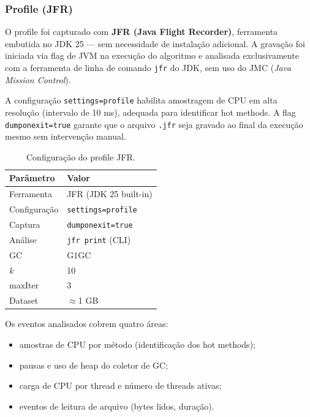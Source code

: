 \subsubsection{Profile (JFR)}

O profile foi capturado com \textbf{JFR (Java Flight Recorder)}, ferramenta embutida
no JDK 25 --- sem necessidade de instalação adicional. A gravação foi iniciada via
flag de JVM na execução do algoritmo e analisada exclusivamente com a ferramenta
de linha de comando \texttt{jfr} do JDK, sem uso do JMC (\textit{Java Mission Control}).

A configuração \texttt{settings=profile} habilita amostragem de CPU em alta resolução
(intervalo de 10 ms), adequada para identificar hot methods. A flag
\texttt{dumponexit=true} garante que o arquivo \texttt{.jfr} seja gravado ao final
da execução mesmo sem intervenção manual.

\begin{table}[H]
\centering
\begin{tabular}{ll}
\hline
\textbf{Parâmetro} & \textbf{Valor} \\
\hline
Ferramenta         & JFR (JDK 25 built-in) \\
Configuração       & \texttt{settings=profile} \\
Captura            & \texttt{dumponexit=true} \\
Análise            & \texttt{jfr print} (CLI) \\
GC                 & G1GC \\
\textit{k}         & 10 \\
maxIter            & 3 \\
Dataset            & $\approx$1 GB \\
\hline
\end{tabular}
\caption{Configuração do profile JFR.}
\label{tab:jfr-config}
\end{table}

Os eventos analisados cobrem quatro áreas:

\begin{itemize}
    \item amostras de CPU por método (identificação dos hot methods);
    \item pausas e uso de heap do coletor de GC;
    \item carga de CPU por thread e número de threads ativas;
    \item eventos de leitura de arquivo (bytes lidos, duração).
\end{itemize}

